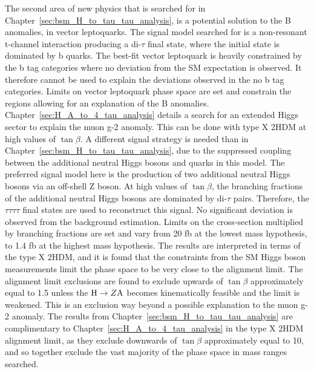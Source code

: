 The second area of new physics that is searched for in Chapter~\ref{sec:bsm_H_to_tau_tau_analysis}, is a potential solution to the B anomalies, in vector leptoquarks.
The signal model searched for is a non-resonant t-channel interaction producing a di-$\tau$ final state, where the initial state is dominated by b quarks.
The best-fit vector leptoquark is heavily constrained by the b tag categories where no deviation from the \ac{SM} expectation is observed.
It therefore cannot be used to explain the deviations observed in the no b tag categories.
Limits on vector leptoquark phase space are set and constrain the regions allowing for an explanation of the B anomalies. \\

Chapter~\ref{sec:H_A_to_4_tau_analysis} details a search for an extended Higgs sector to explain the muon g-2 anomaly.
This can be done with type X \ac{2HDM} at high values of $\tan\beta$.
A different signal strategy is needed than in Chapter~\ref{sec:bsm_H_to_tau_tau_analysis}, due to the suppressed coupling between the additional neutral Higgs bosons and quarks in this model.
The preferred signal model here is the production of two additional neutral Higgs bosons via an off-shell Z boson.
At high values of $\tan\beta$, the branching fractions of the additional neutral Higgs bosons are dominated by di-$\tau$ pairs.
Therefore, the $\tau\tau\tau\tau$ final states are used to reconstruct this signal.
No significant deviation is observed from the background estimation.
Limits on the cross-section multiplied by branching fractions are set and vary from 20 fb at the lowest mass hypothesis, to 1.4 fb at the highest mass hypothesis.
The results are interpreted in terms of the type X \ac{2HDM}, and it is found that the constraints from the \ac{SM} Higgs boson measurements limit the phase space to be very close to the alignment limit.
The alignment limit exclusions are found to exclude upwards of $\tan\beta$ approximately equal to 1.5 unless the ${\text{H}} \rightarrow Z{\text{A}}$ becomes kinematically feasible and the limit is weakened.
This is an exclusion way beyond a possible explanation to the muon g-2 anomaly.
The results from Chapter~\ref{sec:bsm_H_to_tau_tau_analysis} are complimentary to Chapter~\ref{sec:H_A_to_4_tau_analysis} in the type X \ac{2HDM} alignment limit, as they exclude downwards of $\tan\beta$ approximately equal to 10, and so together exclude the vast majority of the phase space in mass ranges searched.

